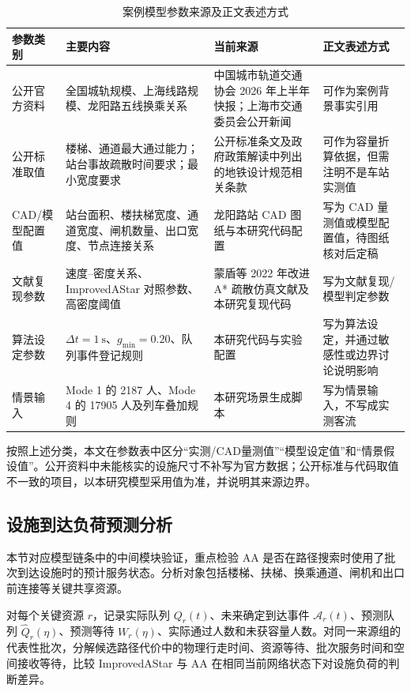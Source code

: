 \documentclass[UTF8,a4paper,12pt]{ctexart}
\begin{document}
\begin{table}[htbp]
\centering
\caption{案例模型参数来源及正文表述方式}
\small
\begin{tabular}{p{}p{}p{}p{}}
\toprule
参数类别 & 主要内容 & 当前来源 & 正文表述方式 \\
\midrule
公开官方资料 & 全国城轨规模、上海线路规模、龙阳路五线换乘关系 & 中国城市轨道交通协会 2026 年上半年快报；上海市交通委员会公开新闻 & 可作为案例背景事实引用 \\
公开标准取值 & 楼梯、通道最大通过能力；站台事故疏散时间要求；最小宽度要求 & 公开标准条文及政府政策解读中列出的地铁设计规范相关条款 & 可作为容量折算依据，但需注明不是车站实测值 \\
CAD/模型配置值 & 站台面积、楼扶梯宽度、通道宽度、闸机数量、出口宽度、节点连接关系 & 龙阳路站 CAD 图纸与本研究代码配置 & 写为 CAD 量测值或模型配置值，待图纸核对后定稿 \\
文献复现参数 & 速度--密度关系、ImprovedAStar 对照参数、高密度阈值 & 蒙盾等 2022 年改进 A* 疏散仿真文献及本研究复现代码 & 写为文献复现/模型判定参数 \\
算法设定参数 & \(\Delta t=1\ \mathrm{s}\)、\(g_{\min}=0.20\)、队列事件登记规则 & 本研究代码与实验配置 & 写为算法设定，并通过敏感性或边界讨论说明影响 \\
情景输入 & Mode 1 的 2187 人、Mode 4 的 17905 人及列车叠加规则 & 本研究场景生成脚本 & 写为情景输入，不写成实测客流 \\
\bottomrule
\end{tabular}
\end{table}

按照上述分类，本文在参数表中区分“实测/CAD量测值”“模型设定值”和“情景假设值”。公开资料中未能核实的设施尺寸不补写为官方数据；公开标准与代码取值不一致的项目，以本研究模型采用值为准，并说明其来源边界。

\subsection{设施到达负荷预测分析}

本节对应模型链条中的中间模块验证，重点检验 AA 是否在路径搜索时使用了批次到达设施时的预计服务状态。分析对象包括楼梯、扶梯、换乘通道、闸机和出口前连接等关键共享资源。

对每个关键资源 \(r\)，记录实际队列 \(Q_r(t)\)、未来确定到达事件 \(\mathcal{A}_r(t)\)、预测队列 \(\widehat Q_r(\eta)\)、预测等待 \(W_r(\eta)\)、实际通过人数和未获容量人数。对同一来源组的代表性批次，分解候选路径代价中的物理行走时间、资源等待、批次服务时间和空间接收等待，比较 ImprovedAStar 与 AA 在相同当前网络状态下对设施负荷的判断差异。
\end{document}
